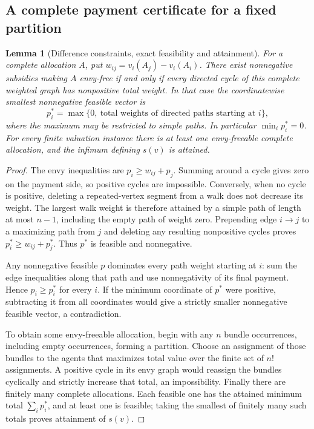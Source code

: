 \documentclass[11pt,a4paper]{article}
\newtheorem{lemma}[theorem]{Lemma}
\theoremstyle{remark}\newtheorem{remark}[theorem]{Remark}
\begin{document}
\subsection{A complete payment certificate for a fixed partition}
\begin{lemma}[Difference constraints, exact feasibility and attainment]\label{lem:graph}
For a complete allocation $A$, put $w_{ij}=v_i(A_j)-v_i(A_i)$. There exist nonnegative subsidies making $A$ envy-free if and only if every directed cycle of this complete weighted graph has nonpositive total weight. In that case the coordinatewise smallest nonnegative feasible vector is
\[
p_i^*=\max\bigl\{0,\ \text{total weights of directed paths starting at }i\bigr\},
\]
where the maximum may be restricted to simple paths. In particular $\min_i p_i^*=0$. For every finite valuation instance there is at least one envy-freeable complete allocation, and the infimum defining $s(v)$ is attained.
\end{lemma}
\begin{proof}
The envy inequalities are $p_i\ge w_{ij}+p_j$. Summing around a cycle gives zero on the payment side, so positive cycles are impossible. Conversely, when no cycle is positive, deleting a repeated-vertex segment from a walk does not decrease its weight. The largest walk weight is therefore attained by a simple path of length at most $n-1$, including the empty path of weight zero. Prepending edge $i\to j$ to a maximizing path from $j$ and deleting any resulting nonpositive cycles proves $p_i^*\ge w_{ij}+p_j^*$. Thus $p^*$ is feasible and nonnegative.

Any nonnegative feasible $p$ dominates every path weight starting at $i$: sum the edge inequalities along that path and use nonnegativity of its final payment. Hence $p_i\ge p_i^*$ for every $i$. If the minimum coordinate of $p^*$ were positive, subtracting it from all coordinates would give a strictly smaller nonnegative feasible vector, a contradiction.

To obtain some envy-freeable allocation, begin with any $n$ bundle occurrences, including empty occurrences, forming a partition. Choose an assignment of those bundles to the agents that maximizes total value over the finite set of $n!$ assignments. A positive cycle in its envy graph would reassign the bundles cyclically and strictly increase that total, an impossibility. Finally there are finitely many complete allocations. Each feasible one has the attained minimum total $\sum_i p_i^*$, and at least one is feasible; taking the smallest of finitely many such totals proves attainment of $s(v)$.
\end{proof}
\end{document}
